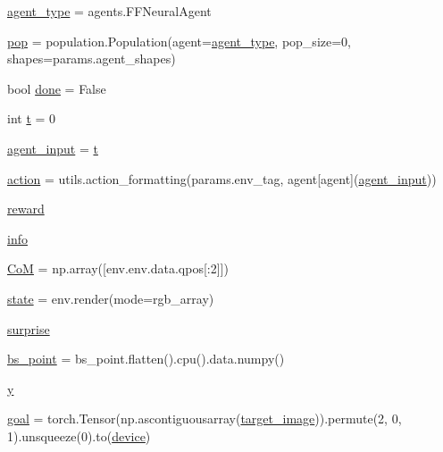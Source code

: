 \begin{DoxyCompactItemize}
\item 
\hyperlink{namespacetest__control_aa591252ece9facc4ba1f1f7a66fbd939}{agent\+\_\+type} = agents.\+F\+F\+Neural\+Agent
\item 
\hyperlink{namespacetest__control_a796fd07016d10db6914d0a5ccccb0732}{pop} = population.\+Population(agent=\hyperlink{namespacetest__control_aa591252ece9facc4ba1f1f7a66fbd939}{agent\+\_\+type}, pop\+\_\+size=0, shapes=params.\+agent\+\_\+shapes)
\item 
bool \hyperlink{namespacetest__control_a4451a5dcdc9ac8f0a6c49ed816f9e021}{done} = False
\item 
int \hyperlink{namespacetest__control_a1bb0f0b642b4210d5e9d01cf8928da82}{t} = 0
\item 
\hyperlink{namespacetest__control_aaa65dc5dc7921eddbe0be1c153c89872}{agent\+\_\+input} = \hyperlink{namespacetest__control_a1bb0f0b642b4210d5e9d01cf8928da82}{t}
\item 
\hyperlink{namespacetest__control_afecd4367e5ef160ad3f6556a535290a9}{action} = utils.\+action\+\_\+formatting(params.\+env\+\_\+tag, agent\mbox{[}\textquotesingle{}agent\textquotesingle{}\mbox{]}(\hyperlink{namespacetest__control_aaa65dc5dc7921eddbe0be1c153c89872}{agent\+\_\+input}))
\item 
\hyperlink{namespacetest__control_a15ad2f6cbc524b2b914dfdd11a2b76b6}{reward}
\item 
\hyperlink{namespacetest__control_ad1d33270a3ae0b4f0502c46c11f29385}{info}
\item 
\hyperlink{namespacetest__control_adade4d639cc4b59b066d579a6c1c3ee1}{CoM} = np.\+array(\mbox{[}env.\+env.\+data.\+qpos\mbox{[}\+:2\mbox{]}\mbox{]})
\item 
\hyperlink{namespacetest__control_a7b0da9f1ea8ad357ed139e89a50d7ca2}{state} = env.\+render(mode=\textquotesingle{}rgb\+\_\+array\textquotesingle{})
\item 
\hyperlink{namespacetest__control_af52c7060bf842b062819b98ccc6a3ad1}{surprise}
\item 
\hyperlink{namespacetest__control_a0e5fe494ac8929ac9bd895b84b5b25c8}{bs\+\_\+point} = bs\+\_\+point.\+flatten().cpu().data.\+numpy()
\item 
\hyperlink{namespacetest__control_a127d50b0c4ee9b0c1af9af28c06195cb}{y}
\item 
\hyperlink{namespacetest__control_a6407063ff49b106a8d24f1b31c76642f}{goal} = torch.\+Tensor(np.\+ascontiguousarray(\hyperlink{namespacetest__control_aebc61fa5fbcc4639b31cb9c4b9e33a17}{target\+\_\+image})).permute(2, 0, 1).unsqueeze(0).to(\hyperlink{namespacetest__control_a7585b10e37df81a5eb7b6df2329a1afd}{device})

\end{DoxyCompactItemize}
